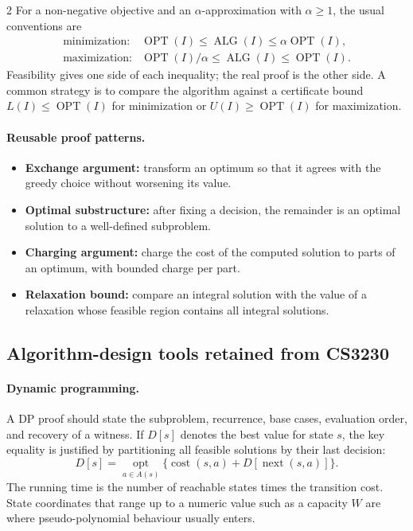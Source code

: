 \documentclass[10pt]{article}
\theoremstyle{definition}
\newcommand{\OPT}{\operatorname{OPT}}
\newcommand{\ALG}{\operatorname{ALG}}
\begin{document}
\begin{multicols*}{2}
For a non-negative objective and an $\alpha$-approximation with $\alpha\ge1$,
the usual conventions are
\[
\begin{array}{ll}
\text{minimization:} & \OPT(I)\le\ALG(I)\le\alpha\OPT(I),\\[2pt]
\text{maximization:} & \OPT(I)/\alpha\le\ALG(I)\le\OPT(I).
\end{array}
\]
Feasibility gives one side of each inequality; the real proof is the other
side.  A common strategy is to compare the algorithm against a certificate
bound $L(I)\le\OPT(I)$ for minimization or $U(I)\ge\OPT(I)$ for maximization.

\paragraph{Reusable proof patterns.}
\begin{itemize}
  \item \textbf{Exchange argument:} transform an optimum so that it agrees
        with the greedy choice without worsening its value.
  \item \textbf{Optimal substructure:} after fixing a decision, the remainder
        is an optimal solution to a well-defined subproblem.
  \item \textbf{Charging argument:} charge the cost of the computed solution
        to parts of an optimum, with bounded charge per part.
  \item \textbf{Relaxation bound:} compare an integral solution with the value
        of a relaxation whose feasible region contains all integral solutions.
\end{itemize}

\subsection{Algorithm-design tools retained from CS3230}

\paragraph{Dynamic programming.}
A DP proof should state the subproblem, recurrence, base cases, evaluation
order, and recovery of a witness.  If $D[s]$ denotes the best value for state
$s$, the key equality is justified by partitioning all feasible solutions by
their last decision:
\[
  D[s]=\operatorname*{opt}_{a\in A(s)}
       \{\operatorname{cost}(s,a)+D[\operatorname{next}(s,a)]\}.
\]
The running time is the number of reachable states times the transition cost.
State coordinates that range up to a numeric value such as a capacity $W$ are
where pseudo-polynomial behaviour usually enters.


\end{multicols*}
\end{document}
